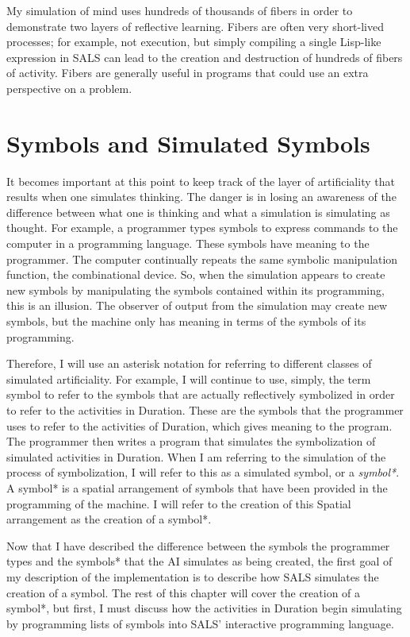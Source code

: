 My simulation of mind uses hundreds of thousands of fibers in order to
demonstrate two layers of reflective learning.  Fibers are often very
short-lived processes; for example, not execution, but simply
compiling a single Lisp-like expression in SALS can lead to the
creation and destruction of hundreds of fibers of activity.  Fibers
are generally useful in programs that could use an extra perspective
on a problem.

\section{Symbols and Simulated Symbols}

It becomes important at this point to keep track of the layer of
artificiality that results when one simulates thinking.  The danger is
in losing an awareness of the difference between what one is thinking
and what a simulation is simulating as thought.  For example, a
programmer types symbols to express commands to the computer in a
programming language.  These symbols have meaning to the programmer.
The computer continually repeats the same symbolic manipulation
function, the combinational device.  So, when the simulation appears
to create new symbols by manipulating the symbols contained within its
programming, this is an illusion.  The observer of output from the
simulation may create new symbols, but the machine only has meaning in
terms of the symbols of its programming.

Therefore, I will use an asterisk notation for referring to different
classes of simulated artificiality.  For example, I will continue to
use, simply, the term symbol to refer to the symbols that are actually
reflectively symbolized in order to refer to the activities in
Duration.  These are the symbols that the programmer uses to refer to
the activities of Duration, which gives meaning to the program.  The
programmer then writes a program that simulates the symbolization of
simulated activities in Duration.  When I am referring to the
simulation of the process of symbolization, I will refer to this as a
simulated symbol, or a \emph{symbol*}.  A symbol* is a spatial
arrangement of symbols that have been provided in the programming of
the machine.  I will refer to the creation of this Spatial arrangement
as the creation of a symbol*.

Now that I have described the difference between the symbols the
programmer types and the symbols* that the AI simulates as being
created, the first goal of my description of the implementation is to
describe how SALS simulates the creation of a symbol.  The rest of
this chapter will cover the creation of a symbol*, but first, I must
discuss how the activities in Duration begin simulating by programming
lists of symbols into SALS' interactive programming language.

